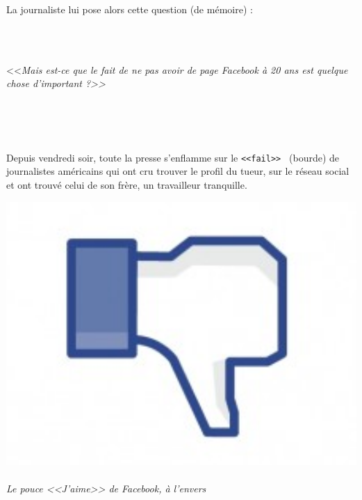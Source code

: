\documentclass[11pt,twoside,a4paper]{article}
\begin{document}
\begin{minipage}[h]{0.75\textwidth}
	La journaliste lui pose alors cette question (de m{\'e}moire) : ~\\~\\
	\begin{minipage}[h]{0.10\textwidth} ~\\ \end{minipage} \hfill \begin{minipage}[h]{0.70\textwidth}
		<<\emph{Mais est-ce que le fait de ne pas avoir de page Facebook {\`a} 20 ans est quelque chose d'important ?>>}
	\end{minipage} \hfill \begin{minipage}[h]{0.15\textwidth} ~\\ \end{minipage} ~\\~\\
	Depuis vendredi soir, toute la presse s'enflamme sur le \texttt{<<fail>>~\footnotemark} (bourde) de journalistes am{\'e}ricains qui ont cru trouver le profil du tueur, sur le r{\'e}seau social et ont trouv{\'e} celui de son fr{\`e}re, un travailleur tranquille. ~\\
\end{minipage} \hfill \begin{minipage}[h]{0.25\textwidth}
	\begin{center}
		\includegraphics[width=1.00\textwidth]{img/pouce_dislike_facebook.jpg}~\\
		\emph{Le pouce <<J'aime>> de Facebook, {\`a} l'envers}
	\end{center}
\end{minipage}~\\~\\
\end{document}
